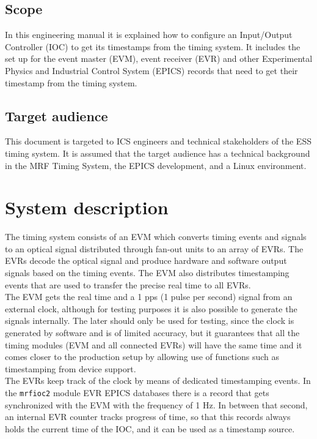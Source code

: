 \documentclass[11pt
  , a4paper
  , article
  , oneside
  , showtrims
]{memoir}
\begin{document}
\section{Scope}
In this engineering manual it is explained how to configure an Input/Output Controller (IOC) to get its timestamps from the timing system. It includes the set up for the event master (EVM), event receiver (EVR) and other Experimental Physics and Industrial Control System (EPICS) records that need to get their timestamp from the timing system.\\


\section{Target audience}
This document is targeted to ICS engineers and technical stakeholders of the ESS timing system. It is assumed that the target audience has a technical background in the MRF Timing System, the EPICS development, and a Linux environment.\\


\chapter{System description}
The timing system consists of an EVM which converts timing events and signals to an optical signal distributed through fan-out units to an array of EVRs. The EVRs decode the optical signal and produce hardware and software output signals based on the timing events. The EVM also distributes timestamping events that are used to transfer the precise real time to all EVRs.\\

The EVM gets the real time and a 1 pps (1 pulse per second) signal from an external clock, although for testing purposes it is also possible to generate the signals internally. The later should only be used for testing, since the clock is generated by software and is of limited accuracy, but it guarantees that all the timing modules (EVM and all connected EVRs) will have the same time and it comes closer to the production setup by allowing use of functions such as timestamping from device support.\\

The EVRs keep track of the clock by means of dedicated timestamping events. In the \texttt{mrfioc2} module EVR EPICS databases there is a record that gets synchronized with the EVM with the frequency of 1 Hz. In between that second, an internal EVR counter tracks progress of time, so that this records always holds the current time of the IOC, and it can be used as a timestamp source.\\
\end{document}
